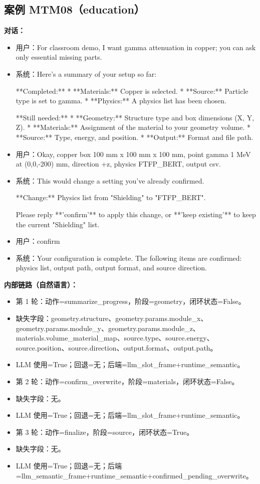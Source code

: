 \documentclass[11pt]{ctexart}
\begin{document}
\subsection{案例 MTM08（education）}
\textbf{对话：}
\begin{itemize}
\item 用户：For classroom demo, I want gamma attenuation in copper; you can ask only essential missing parts.
\item 系统：Here's a summary of your setup so far:

**Completed:**
*   **Materials:** Copper is selected.
*   **Source:** Particle type is set to gamma.
*   **Physics:** A physics list has been chosen.

**Still needed:**
*   **Geometry:** Structure type and box dimensions (X, Y, Z).
*   **Materials:** Assignment of the material to your geometry volume.
*   **Source:** Type, energy, and position.
*   **Output:** Format and file path.
\item 用户：Okay, copper box 100 mm x 100 mm x 100 mm, point gamma 1 MeV at (0,0,-200) mm, direction +z, physics FTFP\_BERT, output csv.
\item 系统：This would change a setting you've already confirmed.

**Change:** Physics list from "Shielding" to "FTFP\_BERT".

Please reply **'confirm'** to apply this change, or **'keep existing'** to keep the current "Shielding" list.
\item 用户：confirm
\item 系统：Your configuration is complete. The following items are confirmed: physics list, output path, output format, and source direction.
\end{itemize}
\textbf{内部链路（自然语言）：}
\begin{itemize}
\item 第 1 轮：动作=summarize\_progress，阶段=geometry，闭环状态=False。
\item 缺失字段：geometry.structure、geometry.params.module\_x、geometry.params.module\_y、geometry.params.module\_z、materials.volume\_material\_map、source.type、source.energy、source.position、source.direction、output.format、output.path。
\item LLM 使用=True；回退=无；后端=llm\_slot\_frame+runtime\_semantic。
\item 第 2 轮：动作=confirm\_overwrite，阶段=materials，闭环状态=False。
\item 缺失字段：无。
\item LLM 使用=True；回退=无；后端=llm\_slot\_frame+runtime\_semantic。
\item 第 3 轮：动作=finalize，阶段=source，闭环状态=True。
\item 缺失字段：无。
\item LLM 使用=True；回退=无；后端=llm\_semantic\_frame+runtime\_semantic+confirmed\_pending\_overwrite。
\end{itemize}
\end{document}
